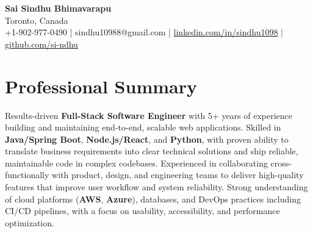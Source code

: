 \documentclass[letterpaper,11pt]{article}
\begin{document}
\begin{center}
  {\Large \textbf{Sai Sindhu Bhimavarapu}} \\
  Toronto, Canada \\
  +1-902-977-0490 \enspace | \enspace sindhu10988@gmail.com \enspace | \enspace \href{https://www.linkedin.com/in/sindhu1098/}{linkedin.com/in/sindhu1098} \enspace | \enspace \href{https://github.com/si-ndhu}{github.com/si-ndhu}
\end{center}

\section{Professional Summary}
  \begin{itemize}[leftmargin=0.15in, label={}]
    \small{\item{
     Results-driven \textbf{Full-Stack Software Engineer} with 5+ years of experience building and maintaining end-to-end, scalable web applications. Skilled in \textbf{Java/Spring Boot}, \textbf{Node.js/React}, and \textbf{Python}, with proven ability to translate business requirements into clear technical solutions and ship reliable, maintainable code in complex codebases. Experienced in collaborating cross-functionally with product, design, and engineering teams to deliver high-quality features that improve user workflow and system reliability. Strong understanding of cloud platforms (\textbf{AWS}, \textbf{Azure}), databases, and DevOps practices including CI/CD pipelines, with a focus on usability, accessibility, and performance optimization.
    }}
  \end{itemize}
\vspace{-16pt}

\end{document}
